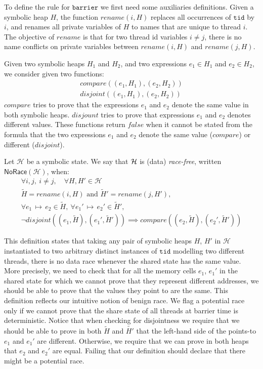 \documentclass[a4paper,11pt]{llncs}
\newcommand{\tid}{\texttt{tid}}
\newcommand{\barrier}{\texttt{barrier}\xspace}
\newcommand{\psto}{{\,{\mapsto}\,}}
\newcounter{note_number}
\begin{document}
To define the rule for $\barrier$ we first need some auxiliaries definitions.
Given a symbolic heap $H$, the function $rename(i, H)$ replaces all occurrences of $\tid$ by $i$, and renames all private variables of $H$ to names that are unique to thread $i$.
The objective of $rename$ is that for two thread id variables $i \neq j$, there is no name conflicts on private variables between $rename(i, H)$ and  $rename(j, H)$.

Given two symbolic heaps $H_1$ and $H_2$, and two expressions $e_1 \in H_1$ and $e_2 \in H_2$, we consider given two functions: 
\[
\begin{array}{l} 
compare((e_1, H_1), (e_2, H_2))
\\[2ex]
disjoint((e_1, H_1), (e_2, H_2))
\end{array}
\] 
$\mathit{compare}$ tries to prove that the expressions $e_1$ and $e_2$ denote the same value in both symbolic heaps.
$\mathit{disjount}$ tries to prove that expressions $e_1$ and $e_2$ denotes different values. These functions return $\mathit{false}$ when it cannot be stated from the formula that the two expressions $e_1$ and $e_2$ denote the same value ($\mathit{compare}$) or different ($\mathit{disjoint}$).

\begin{definition}
\label{def:no_benign_race}
Let $\mathcal{H}$ be a symbolic state. We say that ${\cal H}$  is (data) {\em race-free}, 
 written $\mathsf{NoRace}(\mathcal{H})$, when:
\[
 	\begin{array}{c}
 	\forall i,j,~i \neq j, \quad \forall H, H' \in \mathcal{H} \\ 
	\tilde{H} = rename(i, H) \text{ and } \tilde{H}' = rename(j, H'), \\
	\forall e_1 \psto e_2 \in \tilde{H}, \ \forall e_1' \psto e_2' \in \tilde{H}', \\
 \neg disjoint((e_1, \tilde{H}), (e_1', \tilde{H}')) \implies compare((e_2, \tilde{H}), (e_2', \tilde{H}')) 
	\end{array}
 \]
\end{definition}
This definition states that taking any pair of symbolic heaps $H$, $H'$ in $\mathcal{H}$ instantiated to two arbitrary distinct instances of $\tid$ modelling two different threads, there is no data race whenever the shared state has the same value.
More precisely, we need to check that for all the memory cells $e_1$, $e_1'$ in the shared state for which we cannot prove that they represent different addresses, we should be able to prove that the values they point to are the same. 
This definition reflects our intuitive notion of benign race. We flag a potential race only if we cannot prove that the share state of all threads at barrier time is deterministic.
Notice that when checking for disjointness we require that we should be able to prove  in both $\tilde H$ and $\tilde{H'}$ that the left-hand side of the points-to $e_1$ and $e_1'$ are different. Otherwise, we require that we can prove in both heaps that $e_2$ and $e_2'$ are equal. Failing that our definition should declare that there might be a potential race.
\end{document}
